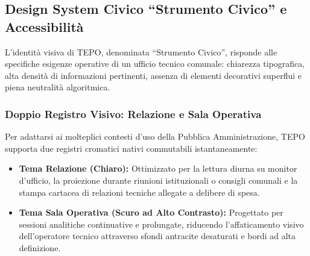 \subsection{Design System Civico ``Strumento Civico'' e Accessibilità}
L'identità visiva di TEPO, denominata ``Strumento Civico'', risponde alle specifiche esigenze operative di un ufficio tecnico comunale: chiarezza tipografica, alta densità di informazioni pertinenti, assenza di elementi decorativi superflui e piena neutralità algoritmica.

\subsubsection{Doppio Registro Visivo: Relazione e Sala Operativa}
Per adattarsi ai molteplici contesti d'uso della Pubblica Amministrazione, TEPO supporta due registri cromatici nativi commutabili istantaneamente:
\begin{itemize}[leftmargin=1.5em, itemsep=0.2em]
    \item \textbf{Tema Relazione (Chiaro):} Ottimizzato per la lettura diurna su monitor d'ufficio, la proiezione durante riunioni istituzionali o consigli comunali e la stampa cartacea di relazioni tecniche allegate a delibere di spesa.
    \item \textbf{Tema Sala Operativa (Scuro ad Alto Contrasto):} Progettato per sessioni analitiche continuative e prolungate, riducendo l'affaticamento visivo dell'operatore tecnico attraverso sfondi antracite desaturati e bordi ad alta definizione.
\end{itemize}

